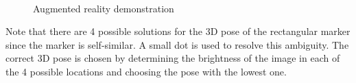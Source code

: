\documentclass[12pt,a4paper,oneside,openright]{book}
\begin{document}
\begin{CJK}{UTF8}{}
\begin{figure}[htbp]
\begin{center}
    \medskip\\
    \caption{Augmented reality demonstration\label{fig:ardemo}}
  \end{center}
\end{figure}
Note that there are 4 possible solutions for the \ac{3D} pose of the rectangular marker since the marker is self-similar. A small dot is used to resolve this ambiguity. The correct \ac{3D} pose is chosen by determining the brightness of the image in each of the 4 possible locations and choosing the pose with the lowest one.



\end{CJK}
\end{document}
